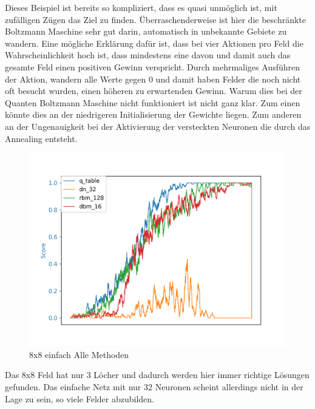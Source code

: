 Dieses Beispiel ist bereits so kompliziert, dass es quasi unmöglich ist, mit zufälligen Zügen das Ziel zu finden. Überraschenderweise ist hier die beschränkte Boltzmann Maschine sehr gut darin, automatisch in unbekannte Gebiete zu wandern. Eine mögliche Erklärung dafür ist, dass bei vier Aktionen pro Feld die Wahrscheinlichkeit hoch ist, dass mindestens eine davon und damit auch das gesamte Feld einen positiven Gewinn verspricht. Durch mehrmaliges Ausführen der Aktion, wandern alle Werte gegen 0 und damit haben Felder die noch nicht oft besucht wurden, einen höheren zu erwartenden Gewinn. Warum dies bei der Quanten Boltzmann Maschine nicht funktioniert ist nicht ganz klar. Zum einen könnte dies an der niedrigeren Initialisierung der Gewichte liegen. Zum anderen an der Ungenauigkeit bei der Aktivierung der versteckten Neuronen die durch das Annealing entsteht.

\begin{figure}[H]
\centering
\includegraphics[width=\textwidth]{Figures/all_8x8_q_table_dn_32_rbm_128_dbm_16.png}
\caption{8x8 einfach Alle Methoden}
\label{all_7}
\end{figure}

Das 8x8 Feld hat nur 3 Löcher und dadurch werden hier immer richtige Lösungen gefunden. Das einfache Netz mit nur 32 Neuronen scheint allerdings nicht in der Lage zu sein, so viele Felder abzubilden.

